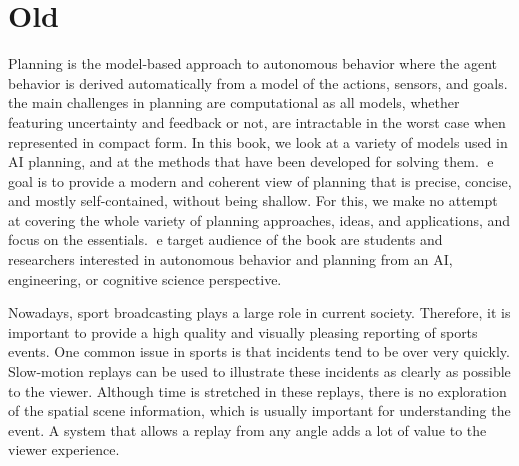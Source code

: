 \section{Old}
Planning is the model-based approach to autonomous behavior where the agent behavior is derived
automatically from a model of the actions, sensors, and goals. the main challenges in planning are
computational as all models, whether featuring uncertainty and feedback or not, are intractable in the
worst case when represented in compact form. In this book, we look at a variety of models used in
AI planning, and at the methods that have been developed for solving them. e goal is to provide
a modern and coherent view of planning that is precise, concise, and mostly self-contained, without
being shallow. For this, we make no attempt at covering the whole variety of planning approaches,
ideas, and applications, and focus on the essentials. e target audience of the book are students and
researchers interested in autonomous behavior and planning from an AI, engineering, or cognitive
science perspective.








Nowadays, sport broadcasting plays a large role in current society.
Therefore, it is important to provide a high quality and visually pleasing reporting of sports events.
One common issue in sports is that incidents tend to be over very quickly.
Slow-motion replays can be used to illustrate these incidents as clearly as possible to the viewer. 
Although time is stretched in these replays, there is no exploration of the spatial scene information, which is 
usually important for understanding the event.
A system that allows a replay from any angle adds a lot of value to the viewer experience.



